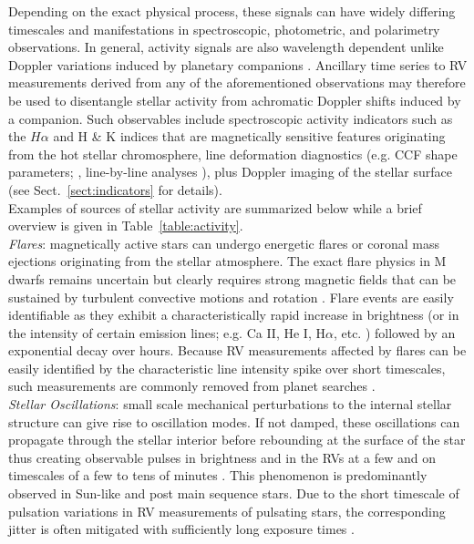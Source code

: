 Depending on the exact physical process, these
signals can have widely differing timescales and manifestations in
spectroscopic, photometric, and polarimetry observations. In general, activity
signals are also wavelength dependent unlike Doppler variations induced by
planetary companions \citep{tal-or18}. Ancillary time series to RV measurements
derived from any of the aforementioned observations may therefore be used to
disentangle stellar activity from achromatic Doppler shifts induced by a companion.
Such observables include spectroscopic activity indicators such as the $H\alpha$ and
\caii{} H \& K indices that are magnetically sensitive features originating from the hot stellar
chromosphere, line deformation diagnostics (e.g. CCF shape parameters; \citealt{boisse11},
line-by-line analyses \citealt{davis17,dumusque18}), plus Doppler imaging of the stellar surface
\citep{hebrard16} (see Sect.~\ref{sect:indicators} for details). \\

Examples of sources of stellar activity are summarized below
while a brief overview is given in Table~\ref{table:activity}. \\



\emph{Flares}: magnetically active stars can undergo energetic flares or coronal mass
ejections originating from the stellar atmosphere. The exact flare physics
in M dwarfs remains uncertain but clearly requires strong magnetic fields
that can be sustained by turbulent convective motions and rotation
\citep{browning08}. Flare events are easily identifiable as they
exhibit a characteristically rapid increase in brightness (or in the intensity
of certain emission lines; e.g. Ca II, He I, H$\alpha$, etc. \citealt{schmidt12})
followed by an exponential decay over hours. Because RV
measurements affected by flares can be easily identified by the characteristic
line intensity spike over short timescales, such measurements are commonly
removed from planet searches \citep{reiners09}. \\

\emph{Stellar Oscillations}:
small scale mechanical perturbations to the internal stellar structure
can give rise to oscillation modes. If not damped, these oscillations
can propagate through the stellar interior before rebounding at the surface
of the star thus creating observable pulses in brightness and in the RVs at a
few \mps{} and on timescales of a few to tens of minutes \citep{bedding01}. 
This phenomenon is predominantly observed in Sun-like and post main sequence stars.
Due to the short timescale of
pulsation variations in RV measurements of pulsating stars, the corresponding
jitter is often mitigated with sufficiently long exposure times
\citep{lovis05, dumusque11a}. \\


